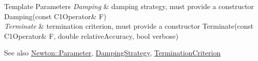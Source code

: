 \begin{DoxyTemplParams}{Template Parameters}
{\em Damping} & damping strategy, must provide a constructor Damping(const C1\+Operator\& F) \\
\hline
{\em Terminate} & termination criterion, must provide a constructor Terminate(const C1\+Operator\& F, double relative\+Accuracy, bool verbose)\\
\hline
\end{DoxyTemplParams}
\begin{DoxySeeAlso}{See also}
\hyperlink{structSpacy_1_1Newton_1_1Parameter}{Newton\+::\+Parameter}, \hyperlink{namespaceSpacy_1_1Newton_ae2ba8821b209bfac2ab9190e6283cf06_Newton_DampingStrategyAnchor}{Damping\+Strategy}, \hyperlink{namespaceSpacy_1_1Newton_abfa64b52531032d7a5fe6d0ec1a3cbd5_Newton_TerminationCriterionAnchor}{Termination\+Criterion} 
\end{DoxySeeAlso}
